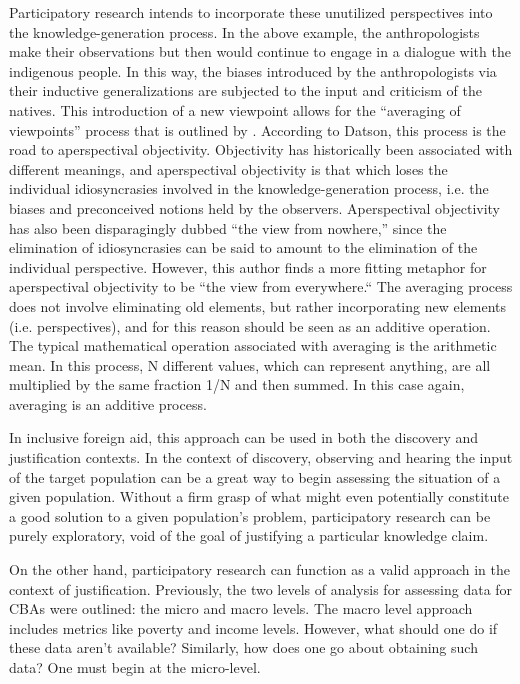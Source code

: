 \documentclass[a4paper]{article}
\begin{document}
Participatory research intends to incorporate these unutilized perspectives
into the knowledge-generation process. In the above example, the
anthropologists make their observations but then would continue to engage in a
dialogue with the indigenous people. In this way, the biases introduced by the
anthropologists via their inductive generalizations are subjected to the input
and criticism of the natives. This introduction of a new viewpoint allows for
the ``averaging of viewpoints'' process that is outlined by
\cite{datson1992objectivity}. According to Datson, this process is the road to
aperspectival objectivity. Objectivity has historically been associated with
different meanings, and aperspectival objectivity is that which loses the
individual idiosyncrasies involved in the knowledge-generation process, i.e.
the biases and preconceived notions held by the observers. Aperspectival
objectivity has also been disparagingly dubbed ``the view from nowhere,''
since the elimination of idiosyncrasies can be said to amount to the
elimination of the individual perspective. However, this author finds a more
fitting metaphor for aperspectival objectivity to be ``the view from
everywhere.`` The averaging process does not involve eliminating old elements,
but rather incorporating new elements (i.e. perspectives), and for this
reason should be seen as an additive operation. The typical mathematical
operation associated with averaging is the arithmetic mean. In this process, N
different values, which can represent anything, are all multiplied by the same
fraction 1/N and then summed. In this case again, averaging is an additive
process.

In inclusive foreign aid, this approach can be used in both the discovery and
justification contexts. In the context of discovery, observing and hearing the
input of the target population can be a great way to begin assessing the
situation of a given population. Without a firm grasp of what might even
potentially constitute a good solution to a given population's problem,
participatory research can be purely exploratory, void of the goal of
justifying a particular knowledge claim.

On the other hand, participatory research can function as a valid approach in
the context of justification. Previously, the two levels of analysis for
assessing data for CBAs were outlined: the micro and macro levels. The macro
level approach includes metrics like poverty and income levels. However, what
should one do if these data aren't available? Similarly, how does one go about
obtaining such data? One must begin at the micro-level.
\end{document}
